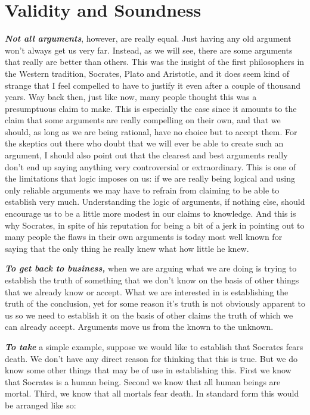 \documentclass[12pt, openany]{book}
\begin{document}
\hypertarget{validity-and-soundness}{%
\section{Validity and Soundness}\label{validity-and-soundness}}

\textbf{\emph{Not all arguments}}, however, are really equal. Just having any old argument won't always get us very far. Instead, as we will see, there are some arguments that really are better than others. This was the insight of the first philosophers in the Western tradition, Socrates, Plato and Aristotle, and it does seem kind of strange that I feel compelled to have to justify it even after a couple of thousand years. Way back then, just like now, many people thought this was a presumptuous claim to make. This is especially the case since it amounts to the claim that some arguments are really compelling on their own, and that we should, as long as we are being rational, have no choice but to accept them. For the skeptics out there who doubt that we will ever be able to create such an argument, I should also point out that the clearest and best arguments really don't end up saying anything very controversial or extraordinary. This is one of the limitations that logic imposes on us: if we are really being logical and using only reliable arguments we may have to refrain from claiming to be able to establish very much. Understanding the logic of arguments, if nothing else, should encourage us to be a little more modest in our claims to knowledge. And this is why Socrates, in spite of his reputation for being a bit of a jerk in pointing out to many people the flaws in their own arguments is today most well known for saying that the only thing he really knew what how little he knew.

\textbf{\emph{To get back to business,}} when we are arguing what we are doing is trying to establish the truth of something that we don't know on the basis of other things that we already know or accept. What we are interested in is establishing the truth of the conclusion, yet for some reason it's truth is not obviously apparent to us so we need to establish it on the basis of other claims the truth of which we can already accept. Arguments move us from the known to the unknown.

\textbf{\emph{To take}} a simple example, suppose we would like to establish that Socrates fears death. We don't have any direct reason for thinking that this is true. But we do know some other things that may be of use in establishing this. First we know that Socrates is a human being. Second we know that all human beings are mortal. Third, we know that all mortals fear death. In standard form this would be arranged like so:
\end{document}
